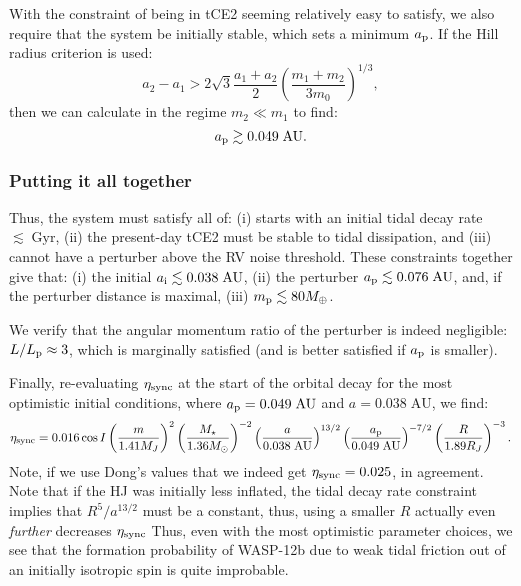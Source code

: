 \documentclass[11pt,
        usenames, %
        dvipsnames %
    ]{article}
\newcommand*{\p}[1]{\left(#1\right)}
\begin{document}
With the constraint of being in tCE2 seeming relatively easy to satisfy, we also
require that the system be initially stable, which sets a minimum $a_{\rm p}$.
If the Hill radius criterion is used:
\begin{equation}
    a_2 - a_1 > 2\sqrt{3}\frac{a_1 + a_2}{2}\p{\frac{m_1 + m_2}{3m_0}}^{1/3},
\end{equation}
then we can calculate in the regime $m_2 \ll m_1$ to find:
\begin{equation}
    a_{\rm p} \gtrsim 0.049\;\mathrm{AU}.
\end{equation}

\subsubsection{Putting it all together}

Thus, the system must satisfy all of: (i) starts with an initial tidal decay
rate $\lesssim \;\mathrm{Gyr}$, (ii) the present-day tCE2 must be stable to
tidal dissipation, and (iii) cannot have a perturber above the RV noise
threshold. These constraints together give that: (i) the initial $a_{\rm i}
\lesssim 0.038\;\mathrm{AU}$, (ii) the perturber $a_{\rm p} \lesssim
0.076\;\mathrm{AU}$, and, if the perturber distance is maximal, (iii) $m_{\rm p}
\lesssim 80 M_{\oplus}$.

We verify that the angular momentum ratio of the perturber is indeed negligible:
$L / L_{\rm p} \approx 3$, which is marginally satisfied (and is better
satisfied if $a_{\rm p}$ is smaller).

Finally, re-evaluating $\eta_{\rm sync}$ at the start of the orbital decay for
the most optimistic initial conditions, where $a_{\rm p} = 0.049\;\mathrm{AU}$
and $a = 0.038\;\mathrm{AU}$, we find:
\begin{equation}
    \eta_{\rm sync} = 0.016 \cos I\p{\frac{m}{1.41M_J}}^2
            \p{\frac{M_\star}{1.36M_{\odot}}}^{-2}
            \p{\frac{a}{0.038\;\mathrm{AU}}}^{13/2}
            \p{\frac{a_{\rm p}}{0.049\;\mathrm{AU}}}^{-7/2}
            \p{\frac{R}{1.89R_{J}}}^{-3}.
\end{equation}
Note, if we use Dong's values that we indeed get $\eta_{\rm sync} = 0.025$, in
agreement. Note that if the HJ was initially less inflated, the tidal decay rate
constraint implies that $R^5 / a^{13/2}$ must be a constant, thus, using a
smaller $R$ actually even \emph{further} decreases $\eta_{\rm sync}$ Thus, even
with the most optimistic parameter choices, we see that the formation
probability of WASP-12b due to weak tidal friction out of an initially isotropic
spin is quite improbable.
\end{document}

